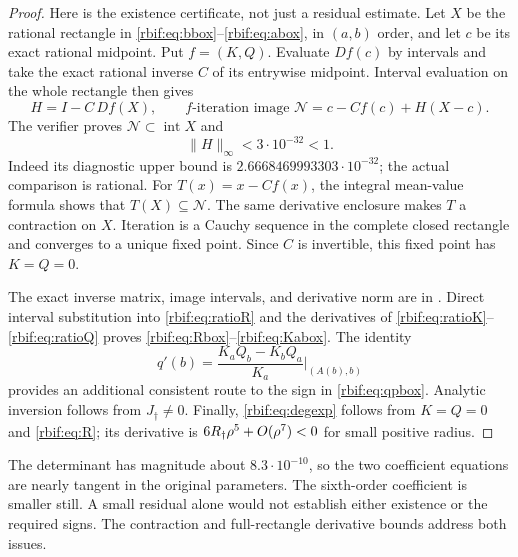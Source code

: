\begin{proof}
Here is the existence certificate, not just a residual estimate.
Let $X$ be the rational rectangle in
\eqref{rbif:eq:bbox}--\eqref{rbif:eq:abox}, in $(a,b)$ order, and
let $c$ be its exact rational midpoint. Put $f=(K,Q)$.
Evaluate $Df(c)$ by intervals and take the exact rational inverse $C$
of its entrywise midpoint. Interval evaluation on the whole rectangle
then gives
\[
 H=I-C\,Df(X),\qquad
 f\text{-iteration image }\mathcal N
 =c-Cf(c)+H(X-c).
\]
The verifier proves $\mathcal N\subset\operatorname{int}X$ and
\begin{equation}
 \|H\|_\infty<3\cdot10^{-32}<1.
 \label{rbif:eq:contraction}
\end{equation}
Indeed its diagnostic upper bound is
$2.6668469993303\cdot10^{-32}$; the actual comparison is rational.
For $T(x)=x-Cf(x)$, the integral mean-value formula shows that
$T(X)\subseteq\mathcal N$. The same derivative enclosure makes $T$
a contraction on $X$. Iteration is a Cauchy sequence in the complete
closed rectangle and converges to a unique fixed point. Since $C$ is
invertible, this fixed point has $K=Q=0$.

The exact inverse matrix, image intervals, and derivative norm are in
. Direct interval substitution into
\eqref{rbif:eq:ratioR} and the derivatives of
\eqref{rbif:eq:ratioK}--\eqref{rbif:eq:ratioQ} proves
\eqref{rbif:eq:Rbox}--\eqref{rbif:eq:Kabox}. The identity
\[
 q'(b)=\frac{K_aQ_b-K_bQ_a}{K_a}\bigg|_{(A(b),b)}
\]
provides an additional consistent route to the sign in
\eqref{rbif:eq:qpbox}. Analytic inversion follows from
$J_\dagger\ne0$. Finally, \eqref{rbif:eq:degexp} follows from
$K=Q=0$ and \eqref{rbif:eq:R}; its derivative is
$6R_\dagger\rho^5+O(\rho^7)<0$ for small positive radius.
\end{proof}

\begin{remark}
The determinant has magnitude about $8.3\cdot10^{-10}$, so the two
coefficient equations are nearly tangent in the original parameters.
The sixth-order coefficient is smaller still. A small residual alone
would not establish either existence or the required signs. The
contraction and full-rectangle derivative bounds address both issues.
\end{remark}

